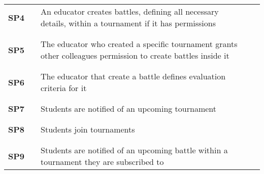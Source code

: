 \begin{longtable}[H]{l l p{8.5cm} l l}
    \textbf{SP4}  & \vline & An educator creates battles, defining all necessary details, within a tournament if it has permissions                                                        & \vline &                        \\
                  &        &                                                                                                          &        &                        \\\hline & & & & \\
    \textbf{SP5}  & \vline & The educator who created a specific tournament grants other colleagues permission to create battles inside it                                         & \vline &                        \\
                  &        &                                                                                                          &        &                        \\\hline & & & & \\
    \textbf{SP6}  & \vline & The educator that create a battle defines evaluation criteria for it                                                         & \vline &                        \\
                  &        &                                                                                                          &        &                        \\\hline & & & & \\
    \textbf{SP7}  & \vline & Students are notified of an upcoming tournament                                                                & \vline &                        \\
                  &        &                                                                                                          &        &                        \\\hline & & & & \\
    \textbf{SP8}  & \vline & Students join tournaments                                                                & \vline &                        \\
                  &        &                                                                                                          &        &                        \\\hline & & & & \\
    \textbf{SP9}  & \vline & Students are notified of an upcoming battle within a tournament they are subscribed to                & \vline &                        \\

\end{longtable}
